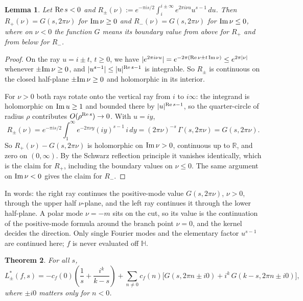 \documentclass[11pt]{article}
\newtheorem{theorem}{Theorem}[section]
\newtheorem{lemma}[theorem]{Lemma}
\newcommand{\HH}{\mathbb{H}}
\newcommand{\RR}{\mathbb{R}}
\begin{document}
\begin{lemma}\label{lem:app-ray}
Let ${\rm Re}\,s<0$ and $R_\pm(\nu):=e^{-\pi is/2}\int_{i}^{i\pm\infty}e^{2\pi i\nu u}u^{s-1}\,du$.
Then $R_+(\nu)=G(s,2\pi\nu)$ for ${\rm Im}\,\nu\ge0$ and $R_-(\nu)=G(s,2\pi\nu)$ for
${\rm Im}\,\nu\le0$, where on $\nu<0$ the function $G$ means its boundary value from above for $R_+$
and from below for $R_-$.
\end{lemma}

\begin{proof}
On the ray $u=i\pm t$, $t\ge0$, we have $|e^{2\pi i\nu u}|=e^{-2\pi({\rm Re}\,\nu\pm t\,{\rm Im}\,\nu)}\le e^{2\pi|\nu|}$
whenever $\pm{\rm Im}\,\nu\ge0$, and $|u^{s-1}|\le|u|^{{\rm Re}\,s-1}$ is integrable. So $R_\pm$ is
continuous on the closed half-plane $\pm{\rm Im}\,\nu\ge0$ and holomorphic in its interior.

For $\nu>0$ both rays rotate onto the vertical ray from $i$ to $i\infty$: the integrand is
holomorphic on ${\rm Im}\,u\ge1$ and bounded there by $|u|^{{\rm Re}\,s-1}$, so the quarter-circle of
radius $\rho$ contributes $O(\rho^{{\rm Re}\,s})\to0$. With $u=iy$,
\[
R_\pm(\nu)=e^{-\pi is/2}\int_1^\infty e^{-2\pi\nu y}(iy)^{s-1}\,i\,dy
=(2\pi\nu)^{-s}\,\Gamma(s,2\pi\nu)=G(s,2\pi\nu).
\]
So $R_+(\nu)-G(s,2\pi\nu)$ is holomorphic on ${\rm Im}\,\nu>0$, continuous up to $\RR$, and zero on
$(0,\infty)$. By the Schwarz reflection principle it vanishes identically, which is the claim
for $R_+$, including the boundary values on $\nu\le0$. The same argument on ${\rm Im}\,\nu<0$
gives the claim for $R_-$.
\end{proof}

In words: the right ray continues the positive-mode value $G(s,2\pi\nu)$, $\nu>0$, through the upper
half $\nu$-plane, and the left ray continues it through the lower half-plane. A polar mode
$\nu=-m$ sits on the cut, so its value is the continuation of the positive-mode formula around the
branch point $\nu=0$, and the kernel decides the direction. Only single Fourier modes and the
elementary factor $u^{s-1}$ are continued here; $f$ is never evaluated off $\HH$.

\begin{theorem}\label{thm:app-BFKpm}
For all $s$,
\begin{equation}\label{eq:app-BFKpm}
L^*_\pm(f,s)=-c_f(0)\left(\frac1s+\frac{i^k}{k-s}\right)
+\sum_{n\ne0}c_f(n)\Big[G(s,2\pi n\pm i0)+i^k\,G(k-s,2\pi n\pm i0)\Big],
\end{equation}
where $\pm i0$ matters only for $n<0$.
\end{theorem}
\end{document}
